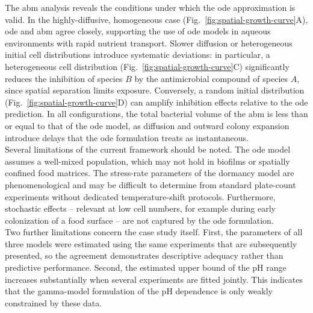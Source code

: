 \documentclass[10pt,1p,authoryear]{elsarticle}
\numberwithin{equation}{section}
\begin{document}
%
The \ac{abm} analysis reveals the conditions under which the \ac{ode} approximation
is valid. In the highly-diffusive, homogeneous case (Fig.~\ref{fig:spatial-growth-curve}A),
\ac{ode} and \ac{abm} agree closely, supporting the use of \ac{ode} models in aqueous
environments with rapid nutrient transport.
Slower diffusion or heterogeneous initial cell distributions introduce systematic
deviations: in particular, a heterogeneous cell distribution
(Fig.~\ref{fig:spatial-growth-curve}C) significantly reduces the inhibition of
species $B$ by the antimicrobial compound of species $A$, since spatial separation
limits exposure.
Conversely, a random initial distribution (Fig.~\ref{fig:spatial-growth-curve}D) can
amplify inhibition effects relative to the \ac{ode} prediction.
In all configurations, the total bacterial volume of the \ac{abm} is less than or equal to
that of the \ac{ode} model, as diffusion and outward colony expansion introduce
delays that the \ac{ode} formulation treats as instantaneous.\\
%
Several limitations of the current framework should be noted.
The \ac{ode} model assumes a well-mixed population, which may not hold in biofilms or
spatially confined food matrices.
The stress-rate parameters of the dormancy model are
phenomenological and may be difficult to determine from standard plate-count
experiments without dedicated temperature-shift protocols.
Furthermore, stochastic effects -- relevant at low cell numbers, for example during early
colonization of a food surface -- are not captured by the \ac{ode} formulation.\\
Two further limitations concern the case study itself. First, the parameters of all three models were estimated using the same experiments that are subsequently presented, so the agreement demonstrates descriptive adequacy rather than predictive performance. Second, the estimated upper bound of the pH range increases substantially when several experiments are fitted jointly. This indicates that the gamma-model formulation of the pH dependence is only weakly constrained by these data.
%
\end{document}
